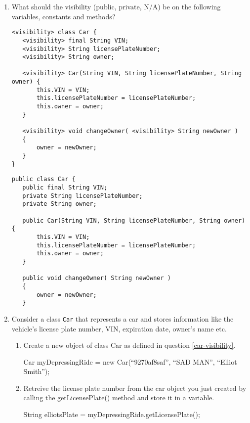 \documentclass[11pt]{article}
\newenvironment{answer}{\large\lstset{basicstyle=\large}\color{white}}{}
\newenvironment{answer}{\large\lstset{basicstyle=\large}\color{red}}{}
\begin{document}
\begin{enumerate}
\item What should the visibility (public, private, N/A) be on the following
      variables, constants and methods?\label{car-visibility}

\begin{lstlisting}
<visibility> class Car {
   <visibility> final String VIN;
   <visibility> String licensePlateNumber;  
   <visibility> String owner;

   <visibility> Car(String VIN, String licensePlateNumber, String owner) {
       this.VIN = VIN;
       this.licensePlateNumber = licensePlateNumber;
       this.owner = owner;
   }

   <visibility> void changeOwner( <visibility> String newOwner )
   {
       owner = newOwner;
   }
}
\end{lstlisting}

    \begin{answer}
\begin{lstlisting}
public class Car {
   public final String VIN;
   private String licensePlateNumber;  
   private String owner;

   public Car(String VIN, String licensePlateNumber, String owner) {
       this.VIN = VIN;
       this.licensePlateNumber = licensePlateNumber;
       this.owner = owner;
   }

   public void changeOwner( String newOwner )
   {
       owner = newOwner;
   }
\end{lstlisting}
    \end{answer}

\item Consider a class {\tt Car} that represents a car and stores information
      like the vehicle's license plate number, VIN, expiration date, owner's
      name etc.

    \begin{enumerate}
    \item Create a new object of class Car as defined in question
        \ref{car-visibility}.
        
        \begin{answer}
        Car myDepressingRide = new Car(``9270af8saf'', ``SAD MAN'', ``Elliot
        Smith'');
        \end{answer}

    \item Retreive the license plate number from the car object you just
    created by calling the getLicensePlate() method and store it in a variable.

        \begin{answer}
        String elliotsPlate = myDepressingRide.getLicensePlate();
        \end{answer}
    \end{enumerate}


\end{enumerate}
\end{document}
